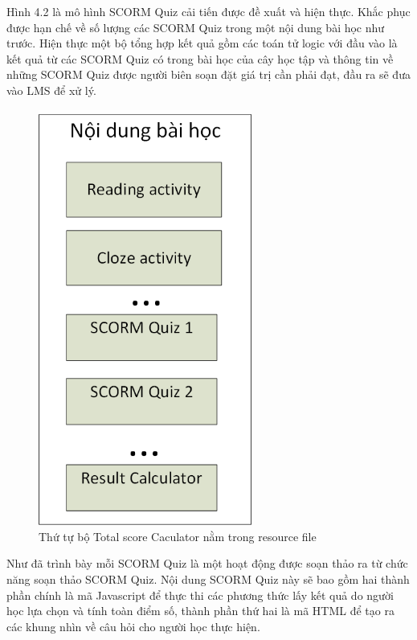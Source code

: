Hình 4.2 là mô hình SCORM Quiz cải tiến được đề xuất và hiện thực. Khắc phục được hạn chế về số lượng các SCORM Quiz trong một nội dung bài học như trước. Hiện thực một bộ tổng hợp kết quả gồm các toán tử logic với đầu vào là kết quả từ các SCORM Quiz có trong bài học của cây học tập và thông tin về những SCORM Quiz được người biên soạn đặt giá trị cần phải đạt, đầu ra sẽ đưa vào LMS để xử lý.

	\begin{center}
	\begin{figure}[htp]
		\begin{center}
			\includegraphics[width=7cm]{Chapter4/Pictures/picture43.png}
		\end{center}
		\caption{Thứ tự bộ Total score Caculator nằm trong resource file}
		\label{refpicture51}
	\end{figure}
\end{center}

	Như đã trình bày mỗi SCORM Quiz là một hoạt động được soạn thảo ra từ chức năng soạn thảo SCORM Quiz. Nội dung SCORM Quiz này sẽ bao gồm hai thành phần chính là mã Javascript để thực thi các phương thức lấy kết quả do người học lựa chọn và tính toàn điểm số, thành phần thứ hai là mã HTML để tạo ra các khung nhìn về câu hỏi cho người học thực hiện. \\
	
